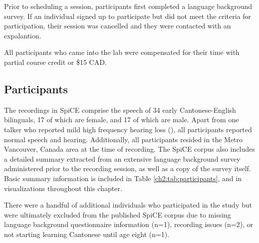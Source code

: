 Prior to scheduling a session, participants first completed a language background survey. If an individual signed up to participate but did not meet the criteria for participation, their session was cancelled and they were contacted with an expalantion.

All participants who came into the lab were compensated for their time with partial course credit or \$15 CAD. 

\subsection{Participants}\label{ch2:subsec:participants} 
The recordings in SpiCE comprise the speech of 34 early Cantonese-English bilinguals, 17 of which are female, and 17 of which are male. Apart from one talker who reported mild high frequency hearing loss (), all participants reported normal speech and hearing. Additionally, all participants resided in the Metro Vancouver, Canada area at the time of recording. The SpiCE corpus also includes a detailed summary extracted from an extensive language background survey administered prior to the recording session, as well as a copy of the survey itself. Basic summary information is included in Table \ref{ch2:tab:participants}, and in visualizations throughout this chapter. 

There were a handful of additional individuals who participated in the study but were ultimately excluded from the published SpiCE corpus due to missing language background questionnaire information (n=1), recording issues (n=2), or not starting learning Cantonese until age eight (n=1).

